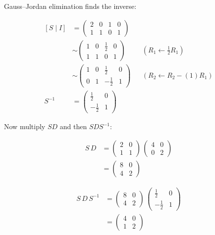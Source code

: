 \documentclass[11pt]{article}
\begin{document}
Gauss--Jordan elimination finds the inverse:

\[\begin{aligned}\left[S\mid I\right] &= \begin{pmatrix}2 & 0 & 1 & 0 \\ 1 & 1 & 0 & 1\end{pmatrix} \\
&\sim \begin{pmatrix}1 & 0 & \frac{1}{2} & 0 \\ 1 & 1 & 0 & 1\end{pmatrix} && \left(R_{1}\leftarrow \frac{1}{2}R_{1}\right) \\
&\sim \begin{pmatrix}1 & 0 & \frac{1}{2} & 0 \\ 0 & 1 & -\frac{1}{2} & 1\end{pmatrix} && \left(R_{2}\leftarrow R_{2}-\left(1\right)R_{1}\right) \\
S^{-1} &= \begin{pmatrix}\frac{1}{2} & 0 \\ -\frac{1}{2} & 1\end{pmatrix}\end{aligned}\]

Now multiply \(SD\) and then \(SDS^{-1}\):

\[\begin{aligned}S\,D &= \begin{pmatrix}2 & 0 \\ 1 & 1\end{pmatrix}\,\begin{pmatrix}4 & 0 \\ 0 & 2\end{pmatrix} \\
&= \begin{pmatrix}8 & 0 \\ 4 & 2\end{pmatrix}\end{aligned}\]

\[\begin{aligned}S\,D\,S^{-1} &= \begin{pmatrix}8 & 0 \\ 4 & 2\end{pmatrix}\,\begin{pmatrix}\frac{1}{2} & 0 \\ -\frac{1}{2} & 1\end{pmatrix} \\
&= \begin{pmatrix}4 & 0 \\ 1 & 2\end{pmatrix}\end{aligned}\]
\end{document}
